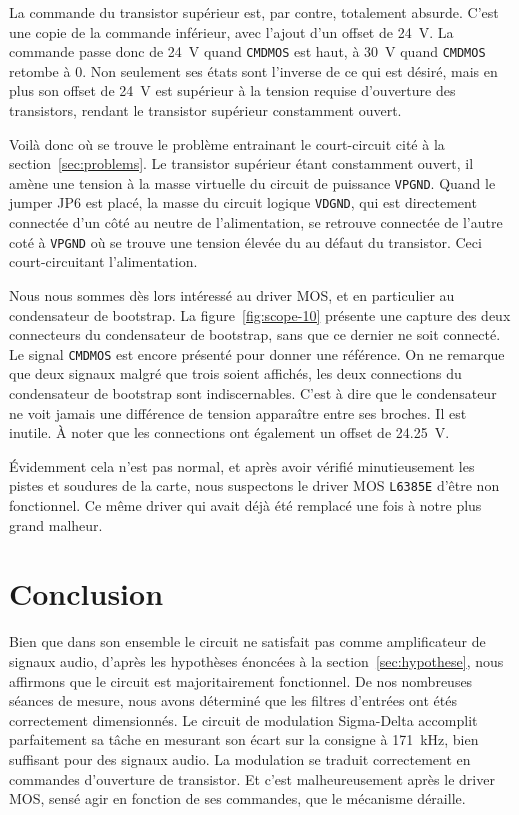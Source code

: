 \documentclass[10pt, oneside, a4paper]{article}
\begin{document}
La commande du transistor supérieur est, par contre, totalement absurde.
C'est une copie de la commande inférieur, avec l'ajout d'un offset de \SI{24}{\volt}.
La commande passe donc de \SI{24}{\volt} quand \texttt{CMDMOS} est haut, à \SI{30}{\volt} quand \texttt{CMDMOS} retombe à 0.
Non seulement ses états sont l'inverse de ce qui est désiré, mais en plus son offset de \SI{24}{\volt} est supérieur à la tension requise d'ouverture des transistors, rendant le transistor supérieur constamment ouvert.

Voilà donc où se trouve le problème entrainant le court-circuit cité à la section~\ref{sec:problems}.
Le transistor supérieur étant constamment ouvert, il amène une tension à la masse virtuelle du circuit de puissance \texttt{VPGND}.
Quand le jumper JP6 est placé, la masse du circuit logique \texttt{VDGND}, qui est directement connectée d'un côté au neutre de l'alimentation, se retrouve connectée de l'autre coté à \texttt{VPGND} où se trouve une tension élevée du au défaut du transistor.
Ceci court-circuitant l'alimentation.

Nous nous sommes dès lors intéressé au driver MOS, et en particulier au condensateur de bootstrap.
La figure~\ref{fig:scope-10} présente une capture des deux connecteurs du condensateur de bootstrap, sans que ce dernier ne soit connecté.
Le signal \texttt{CMDMOS} est encore présenté pour donner une référence.
On ne remarque que deux signaux malgré que trois soient affichés, les deux connections du condensateur de bootstrap sont indiscernables.
C'est à dire que le condensateur ne voit jamais une différence de tension apparaître entre 
ses broches.
Il est inutile.
À noter que les connections ont également un offset de \SI{24.25}{\volt}.

Évidemment cela n'est pas normal, et après avoir vérifié minutieusement les pistes et soudures de la carte, nous suspectons le driver MOS \texttt{L6385E} d'être non fonctionnel.
Ce même driver qui avait déjà été remplacé une fois à notre plus grand malheur.


\section*{Conclusion}
Bien que dans son ensemble le circuit ne satisfait pas comme amplificateur de signaux audio, d'après les hypothèses énoncées à la section~\ref{sec:hypothese}, nous affirmons que le circuit est majoritairement fonctionnel.
De nos nombreuses séances de mesure, nous avons déterminé que les filtres d'entrées ont étés correctement dimensionnés.
Le circuit de modulation Sigma-Delta accomplit parfaitement sa tâche en mesurant son écart sur la consigne à \SI{171}{\kilo\hertz}, bien suffisant pour des signaux audio.
La modulation se traduit correctement en commandes d'ouverture de transistor.
Et c'est malheureusement après le driver MOS, sensé agir en fonction de ses commandes, que le mécanisme déraille.
\end{document}
